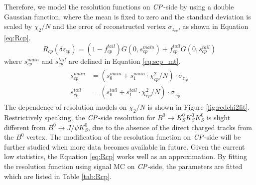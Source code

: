 Therefore, we model the resolution functions on $\it{CP}$-side by using a double Gaussian function, where the mean is fixed to zero and the standard deviation is scaled by $\chi_2/N$ and the error of reconstructed vertex $\sigma_{z_{cp}}$, as shown in Equation \ref{eq:Rcp}.
\begin{equation}\label{eq:Rcp}
R_{cp}(\delta z_{cp}) = (1-f_{cp}^{tail})G(0,s_{cp}^{main})+
f_{cp}^{tail}G(0,s_{cp}^{tail})
\end{equation} where $s_{cp}^{main}$ and $s_{cp}^{tail}$ are defined in Equation \ref{eq:scp_mt}.
\begin{eqnarray}\label{eq:scp_mt}
\begin{split}
s_{cp}^{main}&=(s_0^{main} + s_1^{main}\cdot \chi^2_{cp}/N )\cdot \sigma_{z_{cp}}\\
s_{cp}^{tail}&=(s_0^{tail} + s_1^{tail}\cdot \chi^2_{cp}/N )\cdot \sigma_{z_{cp}}
\end{split}
\end{eqnarray} 
The dependence of resolution models on $\chi_2/N$ is shown in Figure \ref{fig:redchi2fit}. Restrictively speaking, the $\it{CP}$-side resolution for $B^0 \to K_S^0  K_S^0  K_S^0$ is slight different from $B^0\to J/\psi K_S^0$, due to the absence of the direct charged tracks from the $B^0$ vertex. The modification of the resolution function on $\it{CP}$-side will be further studied when more data becomes available in future. Given the current low statistics, the Equation \ref{eq:Rcp} works well as an approximation. By fitting the resolution function using signal MC on $\it{CP}$-side, the parameters are fitted which are listed in Table \ref{tab:Rcp}.

